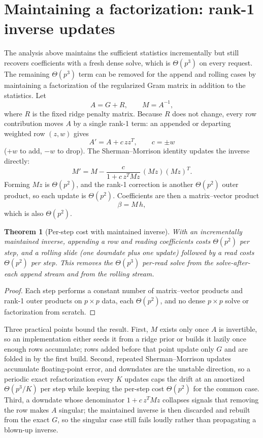 \documentclass[11pt]{article}
\newtheorem{theorem}{Theorem}
\begin{document}
\section{Maintaining a factorization: rank-1 inverse updates}
\label{sec:rank1}

The analysis above maintains the sufficient statistics incrementally but
still recovers coefficients with a fresh dense solve, which is
\(\Theta(p^3)\) on every request.  The remaining \(\Theta(p^3)\) term can
be removed for the append and rolling cases by maintaining a
factorization of the regularized Gram matrix in addition to the
statistics.  Let
\[
  A = G + R, \qquad M = A^{-1},
\]
where \(R\) is the fixed ridge penalty matrix.  Because \(R\) does not
change, every row contribution moves \(A\) by a single rank-1 term: an
appended or departing weighted row \((z, w)\) gives
\[
  A' = A + c\,zz^T, \qquad c = \pm w
\]
(\(+w\) to add, \(-w\) to drop).  The Sherman--Morrison identity updates
the inverse directly:
\[
  M' = M - \frac{c}{1 + c\,z^T M z}\,(Mz)(Mz)^T .
\]
Forming \(Mz\) is \(\Theta(p^2)\), and the rank-1 correction is another
\(\Theta(p^2)\) outer product, so each update is \(\Theta(p^2)\).
Coefficients are then a matrix--vector product
\[
  \beta = M\,h,
\]
which is also \(\Theta(p^2)\).

\begin{theorem}[Per-step cost with maintained inverse]
With an incrementally maintained inverse, appending a row and reading
coefficients costs \(\Theta(p^2)\) per step, and a rolling slide (one
downdate plus one update) followed by a read costs \(\Theta(p^2)\) per
step.  This removes the \(\Theta(p^3)\) per-read solve from the
solve-after-each append stream and from the rolling stream.
\end{theorem}

\begin{proof}
Each step performs a constant number of matrix--vector products and
rank-1 outer products on \(p \times p\) data, each \(\Theta(p^2)\), and
no dense \(p \times p\) solve or factorization from scratch.
\end{proof}

Three practical points bound the result.  First, \(M\) exists only once
\(A\) is invertible, so an implementation either seeds it from a ridge
prior or builds it lazily once enough rows accumulate; rows added before
that point update only \(G\) and are folded in by the first build.
Second, repeated Sherman--Morrison updates accumulate floating-point
error, and downdates are the unstable direction, so a periodic exact
refactorization every \(K\) updates caps the drift at an amortized
\(\Theta(p^3/K)\) per step while keeping the per-step cost \(\Theta(p^2)\)
for the common case.  Third, a downdate whose denominator
\(1 + c\,z^T M z\) collapses signals that removing the row makes \(A\)
singular; the maintained inverse is then discarded and rebuilt from the
exact \(G\), so the singular case still fails loudly rather than
propagating a blown-up inverse.
\end{document}
